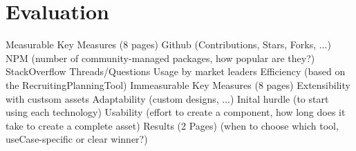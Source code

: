 \chapter{Evaluation}
\label{cha:Evaluation}

	Measurable Key Measures (8 pages)
Github (Contributions, Stars, Forks, ...)
NPM (number of community-managed packages, how popular are they?)
StackOverflow Threads/Questions
Usage by market leaders
Efficiency (based on the RecruitingPlanningTool)
Immeasurable Key Measures (8 pages)
Extensibility with custsom assets
Adaptability (custom designs, ...)
Inital hurdle (to start using each technology)
Usability (effort to create a component, how long does it take to create a complete asset)
Results (2 Pages) (when to choose which tool, useCase-specific or clear winner?)
